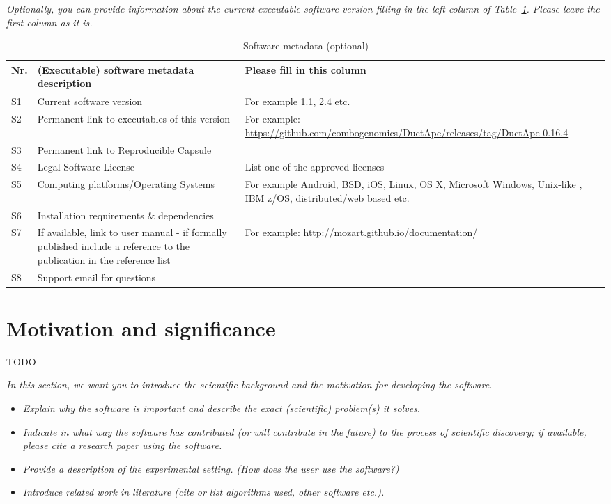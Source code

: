 \documentclass[11pt, a4paper, oneside, onecolumn]{article}
\begin{document}
\textit{Optionally, you can provide information about the current executable
software version filling in the left column of
Table~\ref{executabelMetadata}. Please leave the first column as it is.}

\begin{table}[!h]
\begin{tabular}{|l|p{6.5cm}|p{6.5cm}|}
\hline
\textbf{Nr.} & \textbf{(Executable) software metadata description} & \textbf{Please fill in this column} \\
\hline
S1 & Current software version & For example 1.1, 2.4 etc. \\
\hline
S2 & Permanent link to executables of this version  & For example: \url{https://github.com/combogenomics/DuctApe/releases/tag/DuctApe-0.16.4} \\
\hline
S3  & Permanent link to Reproducible Capsule & \\
\hline
S4 & Legal Software License & List one of the approved licenses \\
\hline
S5 & Computing platforms/Operating Systems & For example Android, BSD, iOS, Linux, OS X, Microsoft Windows, Unix-like , IBM z/OS, distributed/web based etc. \\
\hline
S6 & Installation requirements \& dependencies & \\
\hline
S7 & If available, link to user manual - if formally published include a reference to the publication in the reference list & For example: \url{http://mozart.github.io/documentation/} \\
\hline
S8 & Support email for questions & \\
\hline
\end{tabular}
\caption{Software metadata (optional)}
\label{executabelMetadata} 
\end{table}

\section{Motivation and significance}
TODO \cite{gaston_moose_2009}

\textit{In this section, we want you to introduce the scientific background and the motivation for developing the software.}

\begin{itemize}
    \item \textit{Explain why the software is important and describe the exact (scientific) problem(s) it solves.}
    \item \textit{Indicate in what way the software has contributed (or will contribute in the future) to the process of scientific discovery; if available, please cite a research paper using the software.}
    \item \textit{Provide a description of the experimental setting. (How does the user use the software?)}
    \item \textit{Introduce related work in literature (cite or list algorithms used, other software etc.).}
\end{itemize}
\end{document}
